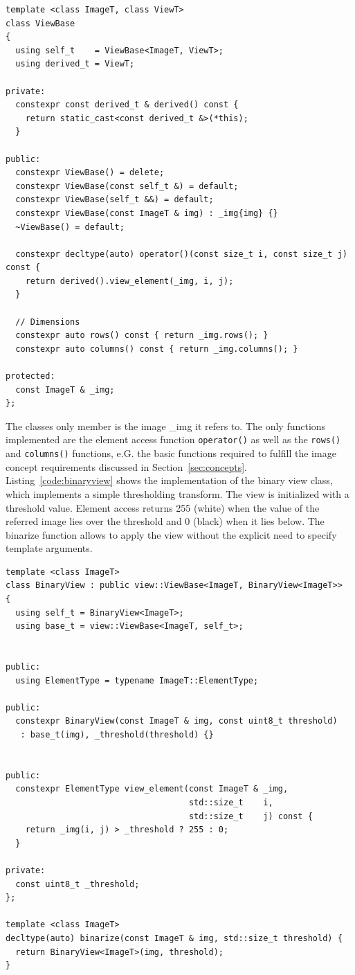 \documentclass[runningheads,a4paper]{llncs}
\begin{document}
\begin{lstlisting}[caption=ViewBase, label=code:viewbase]
template <class ImageT, class ViewT>
class ViewBase
{
  using self_t    = ViewBase<ImageT, ViewT>;
  using derived_t = ViewT;

private:
  constexpr const derived_t & derived() const {
    return static_cast<const derived_t &>(*this);
  }

public:
  constexpr ViewBase() = delete;
  constexpr ViewBase(const self_t &) = default;
  constexpr ViewBase(self_t &&) = default;
  constexpr ViewBase(const ImageT & img) : _img{img} {}
  ~ViewBase() = default;

  constexpr decltype(auto) operator()(const size_t i, const size_t j) const {
    return derived().view_element(_img, i, j);
  }

  // Dimensions
  constexpr auto rows() const { return _img.rows(); }
  constexpr auto columns() const { return _img.columns(); }

protected:
  const ImageT & _img;
};
\end{lstlisting}

The classes only member is the image \_img it refers to. The only functions
implemented are the element access function \lstinline{operator()} as well as the
\lstinline{rows()} and \lstinline{columns()} functions, e.G. the basic functions
required to fulfill the image concept requirements discussed in
Section~\ref{sec:concepts}. Listing~\ref{code:binaryview} shows the
implementation of the binary view class, which implements a simple thresholding
transform. The view is initialized with a threshold value. Element access
returns 255 (white) when the value of the referred image lies over the threshold
and 0 (black) when it lies below. The binarize function allows to apply the view
without the explicit need to specify template arguments.

\begin{lstlisting}[caption=BinaryView, label=code:binaryview]
template <class ImageT>
class BinaryView : public view::ViewBase<ImageT, BinaryView<ImageT>>
{
  using self_t = BinaryView<ImageT>;
  using base_t = view::ViewBase<ImageT, self_t>;


public:
  using ElementType = typename ImageT::ElementType;

public:
  constexpr BinaryView(const ImageT & img, const uint8_t threshold)
   : base_t(img), _threshold(threshold) {}


public:
  constexpr ElementType view_element(const ImageT & _img,
                                     std::size_t    i,
                                     std::size_t    j) const {
    return _img(i, j) > _threshold ? 255 : 0;
  }

private:
  const uint8_t _threshold;
};

template <class ImageT>
decltype(auto) binarize(const ImageT & img, std::size_t threshold) {
  return BinaryView<ImageT>(img, threshold);
}
\end{lstlisting}
\end{document}
